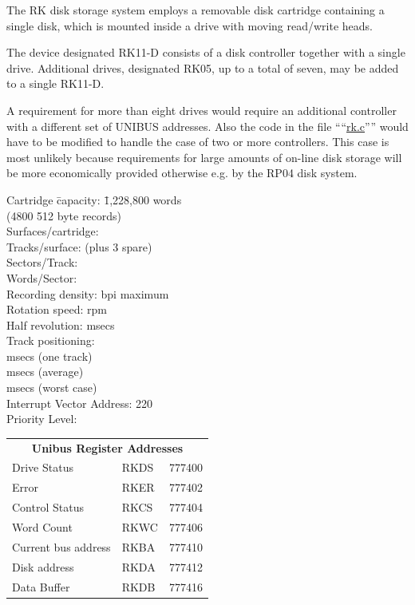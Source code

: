 %
%

The RK disk storage system employs a
removable disk cartridge containing a
single disk, which is mounted inside a
drive with moving read/write heads.

The device designated RK11-D consists
of a disk controller together with a
single drive. Additional drives, designated RK05, up to a total of seven, may
be added to a single RK11-D.

A requirement for more than eight
drives would require an additional controller with a different set of UNIBUS
addresses. Also the code in the file
````\href{./v6/dmr/rk.c}{rk.c}'''' would have to be modified to
handle the case of two or more controllers. This case is most unlikely
because requirements for large amounts
of on-line disk storage will be more
economically provided otherwise e.g.
by the RP04 disk system.


\begin{center}
\begin{tabbing}
Cartridge \= capacity: \= 1,228,800 words\\
\> (4800 512 byte records)\\
Surfaces/cartridge: \> \\
Tracks/surface: \>  (plus 3 spare)\\
Sectors/Track: \> \\
Words/Sector: \> \\
Recording density: \>  bpi maximum\\
Rotation speed: \>  rpm\\
Half revolution: \>  msecs\\
Track positioning:\\
 msecs (one track)\\
 msecs (average)\\
 msecs (worst case)\\
Interrupt Vector Address: 220\\
Priority Level: \> \\
\end{tabbing}
\end{center}

\begin{tabular}{lll}
\multicolumn{3}{c}{\bf Unibus Register Addresses}\\
Drive Status        & RKDS & 777400 \\
Error               & RKER & 777402 \\
Control Status      & RKCS & 777404 \\
Word Count          & RKWC & 777406 \\
Current bus address & RKBA & 777410 \\
Disk address        & RKDA & 777412 \\
Data Buffer         & RKDB & 777416 \\
\end{tabular}

